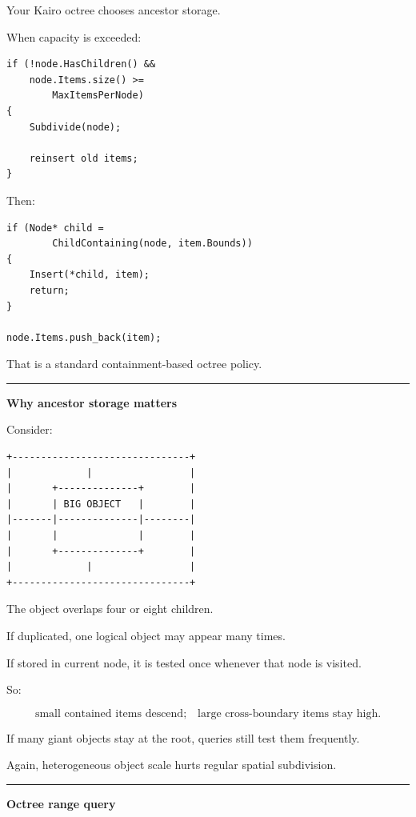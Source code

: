 Your Kairo octree chooses ancestor storage.

When capacity is exceeded:

\begin{verbatim}
if (!node.HasChildren() &&
    node.Items.size() >=
        MaxItemsPerNode)
{
    Subdivide(node);

    reinsert old items;
}
\end{verbatim}

Then:

\begin{verbatim}
if (Node* child =
        ChildContaining(node, item.Bounds))
{
    Insert(*child, item);
    return;
}

node.Items.push_back(item);
\end{verbatim}

That is a standard containment-based octree policy.

\begin{center}\rule{0.5\linewidth}{0.5pt}\end{center}

\textbf{Why ancestor storage matters}

Consider:

\begin{verbatim}
+-------------------------------+
|             |                 |
|       +--------------+        |
|       | BIG OBJECT   |        |
|-------|--------------|--------|
|       |              |        |
|       +--------------+        |
|             |                 |
+-------------------------------+
\end{verbatim}

The object overlaps four or eight children.

If duplicated, one logical object may appear many times.

If stored in current node, it is tested once whenever that node is visited.

So:

\[
\boxed{
\text{small contained items descend;}
\quad
\text{large cross-boundary items stay high}.
}
\]

If many giant objects stay at the root, queries still test them frequently.

Again, heterogeneous object scale hurts regular spatial subdivision.

\begin{center}\rule{0.5\linewidth}{0.5pt}\end{center}

\textbf{Octree range query}

